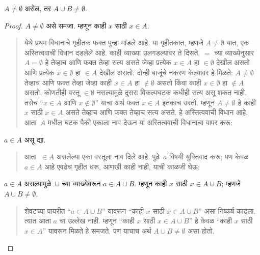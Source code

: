 \begin{prop}
$A \neq \emptyset$ असेल, तर $A \cup B \neq \emptyset$.
\end{prop}

\begin{proof}
$A \neq \emptyset$ असे समजा. म्हणून काही $x$ साठी $x \in A$.
\begin{quote}
येथे प्रथम विधानाचे गृहीतक फक्त पुन्हा मांडले आहे. या गृहीतकात, म्हणजे $A \neq \emptyset$ यात, एक अस्तित्ववाची विधान दडलेले आहे. काही व्याख्या उलगडल्यावर ते दिसते. $=$ च्या व्याख्येनुसार $A = \emptyset$ हे तेव्हाच आणि फक्त तेव्हा सत्य असते जेव्हा प्रत्येक $x \in A$ हा $\in \emptyset$ देखील असतो आणि प्रत्येक $x \in \emptyset$ हा $\in A$ देखील असतो. दोन्ही बाजूंचे नकरण केल्यावर हे मिळते: $A \neq \emptyset$ तेव्हाच आणि फक्त तेव्हा जेव्हा काही $x \in A$ हा $\notin \emptyset$ असतो किंवा काही $x \in \emptyset$ हा $\notin A$ असतो. कोणतीही वस्तू $\in \emptyset$ नसल्यामुळे दुसरा विकल्पघटक कधीही सत्य असू शकत नाही. तसेच “$x \in A$ आणि $x \notin \emptyset$” याचा अर्थ फक्त $x \in A$ इतकाच उरतो. म्हणून $A \neq \emptyset$ हे काही $x$ साठी $x \in A$ असते तेव्हाच आणि फक्त तेव्हाच सत्य असते. हे अस्तित्ववाची विधान आहे. आता~$A$ मधील घटक पैकी एकाला नाव देऊन या अस्तित्ववाची विधानाचा वापर करू:
\end{quote}
$a \in A$ असू द्या.
\begin{quote}
आता~$\in A$ असलेल्या एका वस्तूला नाव दिले आहे. पुढे~$a$ विषयी युक्तिवाद करू; पण केवळ $a \in A$ आहे एवढेच गृहीत धरू, आणखी काही नाही, याची काळजी घेऊ:
\end{quote}
$a \in A$ असल्यामुळे~$\cup$ च्या व्याख्येवरून $a \in A \cup B$. म्हणून काही $x$ साठी $x \in A \cup B$; म्हणजे $A \cup B \neq \emptyset$.
\begin{quote}
शेवटच्या पायरीत “$a \in A \cup B$” यावरून “काही $x$ साठी $x \in A \cup B$” असा निष्कर्ष काढला. त्यात आता $a$ चा उल्लेख नाही. म्हणून “काही $x$ साठी $x \in A \cup B$” हे केवळ “काही $x$ साठी $x \in A$” यावरून मिळते हे समजते. पण याचाच अर्थ $A \cup B \neq \emptyset$ असा होतो.
\end{quote}
\end{proof}

